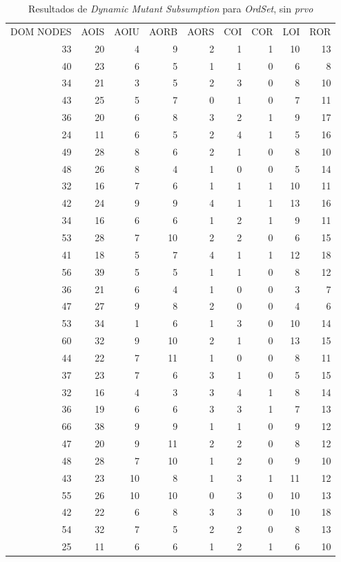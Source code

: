 \begin{table}[]
	\caption{Resultados de \emph{Dynamic Mutant Subsumption} para \emph{OrdSet}, sin \emph{prvo}}
	\label{tables.results.subsumption.ordset.noprvo}
	\centering
	\scriptsize
	\def\arraystretch{0.95}
	\setlength\tabcolsep{0.5mm}
	\begin{tabular}{rrrrrrrrr}
		DOM NODES & AOIS & AOIU & AORB & AORS & COI & COR & LOI & ROR \\
		33 & 20 & 4 & 9 & 2 & 1 & 1 & 10 & 13 \\
		40 & 23 & 6 & 5 & 1 & 1 & 0 & 6 & 8 \\
		34 & 21 & 3 & 5 & 2 & 3 & 0 & 8 & 10 \\
		43 & 25 & 5 & 7 & 0 & 1 & 0 & 7 & 11 \\
		36 & 20 & 6 & 8 & 3 & 2 & 1 & 9 & 17 \\
		24 & 11 & 6 & 5 & 2 & 4 & 1 & 5 & 16 \\
		49 & 28 & 8 & 6 & 2 & 1 & 0 & 8 & 10 \\
		48 & 26 & 8 & 4 & 1 & 0 & 0 & 5 & 14 \\
		32 & 16 & 7 & 6 & 1 & 1 & 1 & 10 & 11 \\
		42 & 24 & 9 & 9 & 4 & 1 & 1 & 13 & 16 \\
		34 & 16 & 6 & 6 & 1 & 2 & 1 & 9 & 11 \\
		53 & 28 & 7 & 10 & 2 & 2 & 0 & 6 & 15 \\
		41 & 18 & 5 & 7 & 4 & 1 & 1 & 12 & 18 \\
		56 & 39 & 5 & 5 & 1 & 1 & 0 & 8 & 12 \\
		36 & 21 & 6 & 4 & 1 & 0 & 0 & 3 & 7 \\
		47 & 27 & 9 & 8 & 2 & 0 & 0 & 4 & 6 \\
		53 & 34 & 1 & 6 & 1 & 3 & 0 & 10 & 14 \\
		60 & 32 & 9 & 10 & 2 & 1 & 0 & 13 & 15 \\
		44 & 22 & 7 & 11 & 1 & 0 & 0 & 8 & 11 \\
		37 & 23 & 7 & 6 & 3 & 1 & 0 & 5 & 15 \\
		32 & 16 & 4 & 3 & 3 & 4 & 1 & 8 & 14 \\
		36 & 19 & 6 & 6 & 3 & 3 & 1 & 7 & 13 \\
		66 & 38 & 9 & 9 & 1 & 1 & 0 & 9 & 12 \\
		47 & 20 & 9 & 11 & 2 & 2 & 0 & 8 & 12 \\
		48 & 28 & 7 & 10 & 1 & 2 & 0 & 9 & 10 \\
		43 & 23 & 10 & 8 & 1 & 3 & 1 & 11 & 12 \\
		55 & 26 & 10 & 10 & 0 & 3 & 0 & 10 & 13 \\
		42 & 22 & 6 & 8 & 3 & 3 & 0 & 10 & 18 \\
		54 & 32 & 7 & 5 & 2 & 2 & 0 & 8 & 13 \\
		25 & 11 & 6 & 6 & 1 & 2 & 1 & 6 & 10
	\end{tabular}
\end{table}

